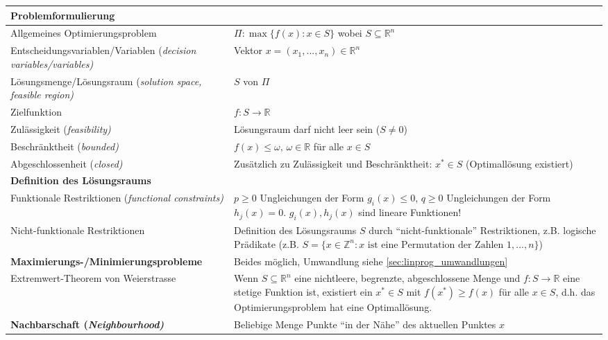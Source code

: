   \begin{tabularx}{\textwidth}{p{7cm} X}
  \hline
    \textbf{Problemformulierung} & \\
  \hline
    Allgemeines Optimierungsproblem
      & $\Pi: \max\{f(x) : x \in S\}$ wobei $S \subseteq \mathbb{R}^n$\\
    Entscheidungsvariablen/Variablen (\em decision variables/variables\em)
      & Vektor $x = (x_1, ..., x_n) \in \mathbb{R}^n$\\
    Lösungsmenge/Lösungsraum (\em solution space, feasible region\em)
      & $S$ von $\Pi$\\
    Zielfunktion
      & $f: S \rightarrow \mathbb{R}$\\
    Zulässigkeit (\em feasibility\em)
      & Lösungsraum darf nicht leer sein ($S \neq 0$)\\
    Beschränktheit (\em bounded\em)
      & $f(x) \leq \omega,\, \omega \in \mathbb{R}$ für alle $x \in S$\\
    Abgeschlossenheit (\em closed\em)
      & Zusätzlich zu Zulässigkeit und Beschränktheit: $x^* \in S$ (Optimallösung existiert)\\
  \hline
    \textbf{Definition des Lösungsraums} & \\
  \hline
    Funktionale Restriktionen (\em functional constraints\em)
      & $p\geq 0$ Ungleichungen der Form $g_i(x) \leq 0$, \newline
        $q \geq 0$ Ungleichungen der Form $h_j(x) = 0$.\newline
        $g_i(x), h_j(x)$ sind lineare Funktionen!\\
    Nicht-funktionale Restriktionen 
      & Definition des Lösungsraums $S$ durch "`nicht-funktionale"' Restriktionen, z.B. logische Prädikate (z.B. $S=\{x \in \mathbb{Z}^n: x \text{ ist eine Permutation der Zahlen } 1,...,n \}$) \\
  \hline
    \textbf{Maximierungs-/Minimierungsprobleme} & Beides möglich, Umwandlung siehe \ref{sec:linprog_umwandlungen}\\
  \hline
    Extremwert-Theorem von Weierstrasse
      & Wenn $S \subseteq \mathbb{R}^n$ eine nichtleere, begrenzte, abgeschlossene Menge und $f: S \rightarrow \mathbb{R}$ eine stetige Funktion ist, existiert ein $x^* \in S$ mit $f(x^*) \geq f(x)$
       für alle $x \in S$, d.h. das Optimierungsproblem hat eine Optimallösung.\\
  \hline
    \textbf{Nachbarschaft (\em Neighbourhood\em)} & Beliebige Menge Punkte "`in der Nähe"' des aktuellen Punktes $x$\\

\end{tabularx}
